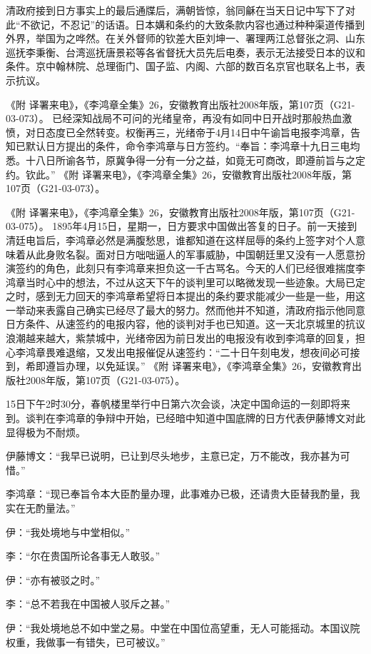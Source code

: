 \documentclass[12pt,UTF8]{ctexbook}
\begin{document}
清政府接到日方事实上的最后通牒后，满朝皆惊，翁同龢在当天日记中写下了对此“不欲记，不忍记”的话语。日本媾和条约的大致条款内容也通过种种渠道传播到外界，举国为之哗然。在关外督师的钦差大臣刘坤一、署理两江总督张之洞、山东巡抚李秉衡、台湾巡抚唐景崧等各省督抚大员先后电奏，表示无法接受日本的议和条件。京中翰林院、总理衙门、国子监、内阁、六部的数百名京官也联名上书，表示抗议。

《附 译署来电》，《李鸿章全集》26，安徽教育出版社2008年版，第107页（G21-03-073）。
已经深知战局不可问的光绪皇帝，再没有如同中日开战时那般热血激愤，对日态度已全然转变。权衡再三，光绪帝于4月14日中午谕旨电报李鸿章，告知已默认日方提出的条件，命令李鸿章与日方签约。“奉旨：李鸿章十九日三电均悉。十八日所谕各节，原冀争得一分有一分之益，如竟无可商改，即遵前旨与之定约。钦此。” 《附 译署来电》，《李鸿章全集》26，安徽教育出版社2008年版，第107页（G21-03-073）。

《附 译署来电》，《李鸿章全集》26，安徽教育出版社2008年版，第107页（G21-03-075）。
1895年4月15日，星期一，日方要求中国做出答复的日子。前一天接到清廷电旨后，李鸿章必然是满腹愁思，谁都知道在这样屈辱的条约上签字对个人意味着从此身败名裂。面对日方咄咄逼人的军事威胁，中国朝廷里又没有一人愿意扮演签约的角色，此刻只有李鸿章来担负这一千古骂名。今天的人们已经很难揣度李鸿章当时心中的想法，不过从这天下午的谈判里可以略微发现一些迹象。大局已定之时，感到无力回天的李鸿章希望将日本提出的条约要求能减少一些是一些，用这一举动来表露自己确实已经尽了最大的努力。然而他并不知道，清政府指示他同意日方条件、从速签约的电报内容，他的谈判对手也已知道。这一天北京城里的抗议浪潮越来越大，紫禁城中，光绪帝因为前日发出的电报没有收到李鸿章的回复，担心李鸿章畏难退缩，又发出电报催促从速签约：“二十日午刻电发，想夜间必可接到，希即遵旨办理，以免延误。” 《附 译署来电》，《李鸿章全集》26，安徽教育出版社2008年版，第107页（G21-03-075）。

15日下午2时30分，春帆楼里举行中日第六次会谈，决定中国命运的一刻即将来到。谈判在李鸿章的争辩中开始，已经暗中知道中国底牌的日方代表伊藤博文对此显得极为不耐烦。

伊藤博文：“我早已说明，已让到尽头地步，主意已定，万不能改，我亦甚为可惜。”

李鸿章：“现已奉旨令本大臣酌量办理，此事难办已极，还请贵大臣替我酌量，我实在无酌量法。”

伊：“我处境地与中堂相似。”

李：“尔在贵国所论各事无人敢驳。”

伊：“亦有被驳之时。”

李：“总不若我在中国被人驳斥之甚。”

伊：“我处境地总不如中堂之易。中堂在中国位高望重，无人可能摇动。本国议院权重，我做事一有错失，已可被议。”
\end{document}
